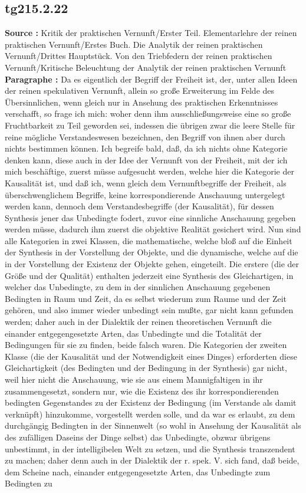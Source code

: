 \documentclass[a4paper,12pt,twoside]{book}
\begin{document}
	\subsection*{tg215.2.22} 
	\textbf{Source : }Kritik der praktischen Vernunft/Erster Teil. Elementarlehre der reinen praktischen Vernunft/Erstes Buch. Die Analytik der reinen praktischen Vernunft/Drittes Hauptstück. Von den Triebfedern der reinen praktischen Vernunft/Kritische Beleuchtung der Analytik der reinen praktischen Vernunft\\  
	
	\noindent\textbf{Paragraphe : }Da es eigentlich der Begriff der Freiheit ist, der, unter allen Ideen der reinen spekulativen Vernunft, allein so große Erweiterung im Felde des Übersinnlichen, wenn gleich nur in Ansehung des praktischen Erkenntnisses verschafft, so frage ich mich: woher denn ihm ausschließungsweise eine so große Fruchtbarkeit zu Teil geworden sei, indessen die übrigen zwar die leere Stelle für reine mögliche Verstandeswesen bezeichnen, den Begriff von ihnen aber durch nichts bestimmen können. Ich begreife bald, daß, da ich nichts ohne Kategorie denken kann, diese auch in der Idee der Vernunft von der Freiheit, mit der ich mich beschäftige, zuerst müsse aufgesucht werden, welche hier die Kategorie der Kausalität ist, und daß ich, wenn gleich dem Vernunftbegriffe der Freiheit, als überschwenglichem Begriffe, keine korrespondierende Anschauung untergelegt werden kann, dennoch dem Verstandesbegriffe (der Kausalität), für dessen Synthesis jener das Unbedingte fodert, zuvor eine sinnliche Anschauung gegeben werden müsse, dadurch ihm zuerst die objektive Realität gesichert wird. Nun sind alle Kategorien in zwei Klassen, die mathematische, welche bloß auf die Einheit der Synthesis in der Vorstellung der Objekte, und die dynamische, welche auf die in der Vorstellung der Existenz der Objekte gehen, eingeteilt. Die erstere (die der Größe und der Qualität) enthalten jederzeit eine Synthesis des Gleichartigen, in welcher das Unbedingte, zu dem in der sinnlichen Anschauung gegebenen Bedingten in Raum und Zeit, da es selbst wiederum zum Raume und der Zeit gehören, und also  immer wieder unbedingt sein mußte, gar nicht kann gefunden werden; daher auch in der Dialektik der reinen theoretischen Vernunft die einander entgegengesetzte Arten, das Unbedingte und die Totalität der Bedingungen für sie zu finden, beide falsch waren. Die Kategorien der zweiten Klasse (die der Kausalität und der Notwendigkeit eines Dinges) erforderten diese Gleichartigkeit (des Bedingten und der Bedingung in der Synthesis) gar nicht, weil hier nicht die Anschauung, wie sie aus einem Mannigfaltigen in ihr zusammengesetzt, sondern nur, wie die Existenz des ihr korrespondierenden bedingten Gegenstandes zu der Existenz der Bedingung (im Verstande als damit verknüpft) hinzukomme, vorgestellt werden solle, und da war es erlaubt, zu dem durchgängig Bedingten in der Sinnenwelt (so wohl in Ansehung der Kausalität als des zufälligen Daseins der Dinge selbst) das Unbedingte, obzwar übrigens unbestimmt, in der intelligibelen Welt zu setzen, und die Synthesis transzendent zu machen; daher denn auch in der Dialektik der r. spek. V. sich fand, daß beide, dem Scheine nach, einander entgegengesetzte Arten, das Unbedingte zum Bedingten zu 
\end{document}
